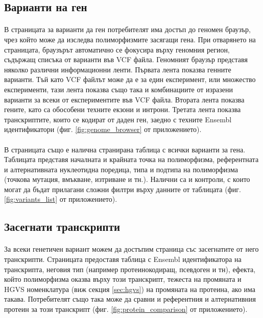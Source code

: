 \documentclass[pdftex,cyrillic,14pt,a4page,twoside,openright]{extreport}
\begin{document}
\subsection{Варианти на ген}
\paragraph{}
В страницата за варианти да ген потребителят има достъп до геномен браузър, чрез който може да изследва полиморфизмите засягащи гена. При отварянето на страницата, браузърът автоматично се фокусира върху геномния регион, съдържащ списъка от варианти във VCF файла. Геномният браузър представя няколко различни информационни ленти. Първата лента показва генните варианти. Тъй като VCF файлът може да е за един експеримент, или множество експерименти, тази лента показва също така и комбинациите от изразени варианти за всеки от експериментите във VCF файла. Втората лента показва гените, като са обособени техните екзони и интрони. Третата лента показва транскриптите, които се кодират от даден ген, заедно с техните Ensembl идентификатори (фиг. \ref{fig:genome_browser} от приложението).

\paragraph{}
В страницата също е налична странирана таблица с всички варианти за гена. Таблицата представя началната и крайната точка на полиморфизма, референтната и алтернативната нуклеотидна поредица, типа и подтипа на полиморфизма (точкова мутация, вмъкване, изтриване и тн.). Налични са и контроли, с които могат да бъдат прилагани сложни филтри върху данните от таблицата (фиг. \ref{fig:variants_list} от приложението).

\subsection{Засегнати транскрипти}\label{sec:affected_transcripts}
\paragraph{}
За всеки генетичен вариант можем да достъпим страница със засегнатите от него транскрипти. Страницата предоставя таблица с Ensembl идентификатора на транскрипта, неговия тип (например протеинокодиращ, псевдоген и тн), ефекта, който полиморфизма оказва върху този транскрипт, тежеста на промяната и HGVS номенклатура (виж секция \ref{sec:hgvs}) на промяната на протеина, ако има такава. Потребителят също така може да сравни и референтния и алтернативния протеин за този транскрипт (фиг. \ref{fig:protein_comparison} от приложението).
\end{document}
